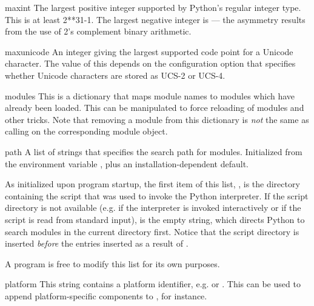 \begin{datadesc}{maxint}
  The largest positive integer supported by Python's regular integer
  type.  This is at least 2**31-1.  The largest negative integer is
   --- the asymmetry results from the use of 2's
  complement binary arithmetic.
\end{datadesc}

\begin{datadesc}{maxunicode}
  An integer giving the largest supported code point for a Unicode
  character.  The value of this depends on the configuration option
  that specifies whether Unicode characters are stored as UCS-2 or
  UCS-4.
\end{datadesc}

\begin{datadesc}{modules}
  This is a dictionary that maps module names to modules which have
  already been loaded.  This can be manipulated to force reloading of
  modules and other tricks.  Note that removing a module from this
  dictionary is \emph{not} the same as calling
   on the corresponding module
  object.
\end{datadesc}

\begin{datadesc}{path}
  A list of strings that specifies the search path for modules.
  Initialized from the environment variable , plus an
  installation-dependent default.

  As initialized upon program startup,
  the first item of this list, , is the directory
  containing the script that was used to invoke the Python
  interpreter.  If the script directory is not available (e.g.  if the
  interpreter is invoked interactively or if the script is read from
  standard input),  is the empty string, which directs
  Python to search modules in the current directory first.  Notice
  that the script directory is inserted \emph{before} the entries
  inserted as a result of .

  A program is free to modify this list for its own purposes.

\end{datadesc}

\begin{datadesc}{platform}
  This string contains a platform identifier, e.g.  or
  .  This can be used to append platform-specific
  components to , for instance.
\end{datadesc}

